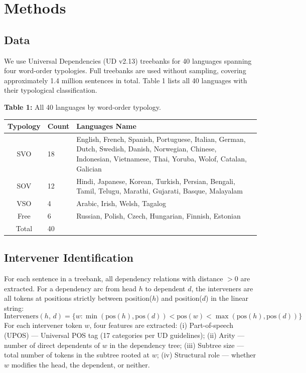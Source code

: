 \documentclass[11pt,a4paper]{article}
\begin{document}
\section{Methods}

\subsection{Data}
We use Universal Dependencies (UD v2.13) treebanks for 40 languages spanning four word-order typologies. Full treebanks are used without sampling, covering approximately 1.4 million sentences in total. Table 1 lists all 40 languages with their typological classification.

\vspace{3pt}
\noindent\textbf{Table 1:} All 40 languages by word-order typology.
\begin{table}[H]
\centering\small
\begin{tabular}{@{}clp{10.5cm}@{}}
\toprule
\textbf{Typology} & \textbf{Count} & \textbf{Languages Name} \\
\midrule
SVO  & 18 & English, French, Spanish, Portuguese, Italian, German, Dutch, Swedish, Danish, Norwegian, Chinese, Indonesian, Vietnamese, Thai, Yoruba, Wolof, Catalan, Galician \\
SOV  & 12 & Hindi, Japanese, Korean, Turkish, Persian, Bengali, Tamil, Telugu, Marathi, Gujarati, Basque, Malayalam \\
VSO  &  4 & Arabic, Irish, Welsh, Tagalog \\
Free &  6 & Russian, Polish, Czech, Hungarian, Finnish, Estonian \\
\midrule
Total & 40 & \\
\bottomrule
\end{tabular}
\end{table}

\subsection{Intervener Identification}
For each sentence in a treebank, all dependency relations with distance $> 0$ are extracted. For a dependency arc from head $h$ to dependent $d$, the interveners are all tokens at positions strictly between position($h$) and position($d$) in the linear string:
\[
\text{Interveners}(h,\,d) = \bigl\{w : \min(\text{pos}(h),\text{pos}(d)) < \text{pos}(w) < \max(\text{pos}(h),\text{pos}(d))\bigr\}
\]
For each intervener token $w$, four features are extracted: (i) Part-of-speech (UPOS) --- Universal POS tag (17 categories per UD guidelines); (ii) Arity --- number of direct dependents of $w$ in the dependency tree; (iii) Subtree size --- total number of tokens in the subtree rooted at $w$; (iv) Structural role --- whether $w$ modifies the head, the dependent, or neither.
\end{document}
